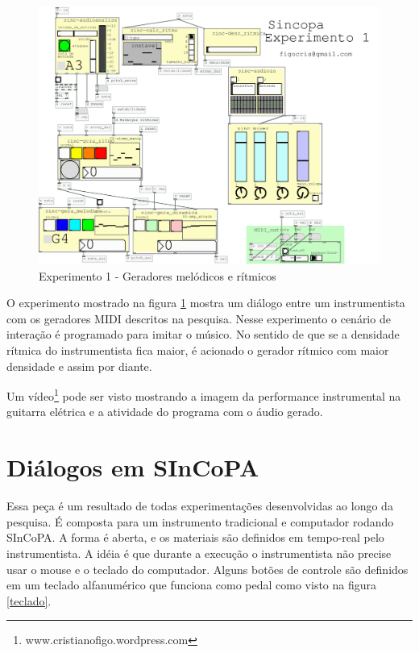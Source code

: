 \documentclass{ppgmus}
\begin{document}
\begin{figure}
\includegraphics[scale=.6]{experimento1}
\caption{Experimento 1 - Geradores melódicos e rítmicos}
\label{experimento1}
\end{figure}


O experimento mostrado na figura \ref{experimento1} mostra um diálogo
entre um instrumentista com os geradores MIDI descritos na pesquisa.
Nesse experimento o cenário de interação é programado para imitar
o músico. No sentido de que se a densidade rítmica do instrumentista fica maior,
é acionado o gerador rítmico com maior densidade e assim por diante.

Um vídeo\footnote{www.cristianofigo.wordpress.com} pode ser visto mostrando a imagem da performance instrumental
na guitarra elétrica e a atividade do programa com o áudio gerado.



\section{Diálogos em SInCoPA}
\label{chap:dialogos}

Essa peça é um resultado de todas experimentações desenvolvidas ao longo da pesquisa. É
composta para um instrumento tradicional e computador rodando SInCoPA. A forma é aberta,
e os materiais são definidos em tempo-real pelo instrumentista. A idéia é que durante a
execução o instrumentista não precise usar o mouse e o teclado do 
computador. Alguns botões de controle são definidos em um teclado alfanumérico que funciona como
pedal como visto na figura \ref{teclado}.
\end{document}
